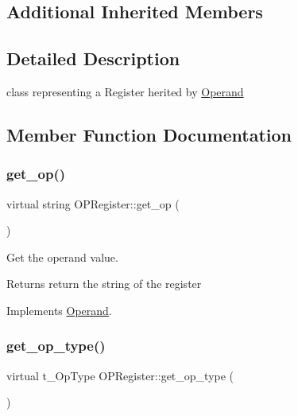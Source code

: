 \subsection*{Additional Inherited Members}


\subsection{Detailed Description}
class representing a Register herited by \mbox{\hyperlink{class_operand}{Operand}} 

\subsection{Member Function Documentation}
\mbox{\label{class_o_p_register_a3f9f6cad40b83eee3f88a2e84a0ccffa}} 
\subsubsection{\texorpdfstring{get\+\_\+op()}{get\_op()}}
{\footnotesize\ttfamily virtual string O\+P\+Register\+::get\+\_\+op (\begin{DoxyParamCaption}{ }\end{DoxyParamCaption})\hspace{0.3cm}{\ttfamily [virtual]}}



Get the operand value. 

\begin{DoxyReturn}{Returns}
return the string of the register 
\end{DoxyReturn}


Implements \mbox{\hyperlink{class_operand_a2bf3ad8b34d39cb35ff743ffcc0f4675}{Operand}}.

\mbox{\label{class_o_p_register_a1be03d6e6422510a1fd12d1f13dfd601}} 
\subsubsection{\texorpdfstring{get\+\_\+op\+\_\+type()}{get\_op\_type()}}
{\footnotesize\ttfamily virtual t\+\_\+\+Op\+Type O\+P\+Register\+::get\+\_\+op\+\_\+type (\begin{DoxyParamCaption}{ }\end{DoxyParamCaption})\hspace{0.3cm}{\ttfamily [virtual]}}



